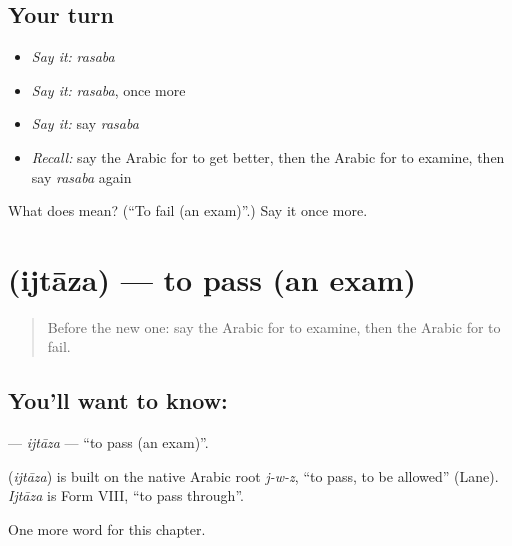 \subsection*{Your turn}
\begin{itemize}
\raggedright
  \item \emph{Say it:} \emph{rasaba}
  \item \emph{Say it:} \emph{rasaba}, once more
  \item \emph{Say it:} say \emph{rasaba}
  \item \emph{Recall:} say the Arabic for to get better, then the Arabic for to examine, then say \emph{rasaba} again
\end{itemize}

\begin{tcolorbox}[breakable,colback=teal!4,colframe=teal!35!black,title={Before you move on}]
What does  mean? (\textquotedblleft{}To fail (an exam)\textquotedblright{}.) Say it once more.
\end{tcolorbox}
\section[\texorpdfstring{\ar{اجتاز} (ijtāza)}{اجتاز (ijtāza)}]{ (ijtāza) — to pass (an exam)}

\label{lesson:AR-C256-ijtaza}



\begin{quote}
Before the new one: say the Arabic for to examine, then the Arabic for to fail.
\end{quote}

\subsection*{You'll want to know: }
\textbf{} — \emph{ijtāza} — \textquotedblleft{}to pass (an exam)\textquotedblright{}.

\begin{cousinweb}
\textbf{} (\emph{ijtāza}) is built on the native Arabic root \emph{j-w-z}, \textquotedblleft{}to pass, to be allowed\textquotedblright{} (Lane). \emph{Ijtāza} is Form VIII, \textquotedblleft{}to pass through\textquotedblright{}.
\end{cousinweb}

\begin{grammarlens}[title={What you've built}]
One more word for this chapter.
\end{grammarlens}

